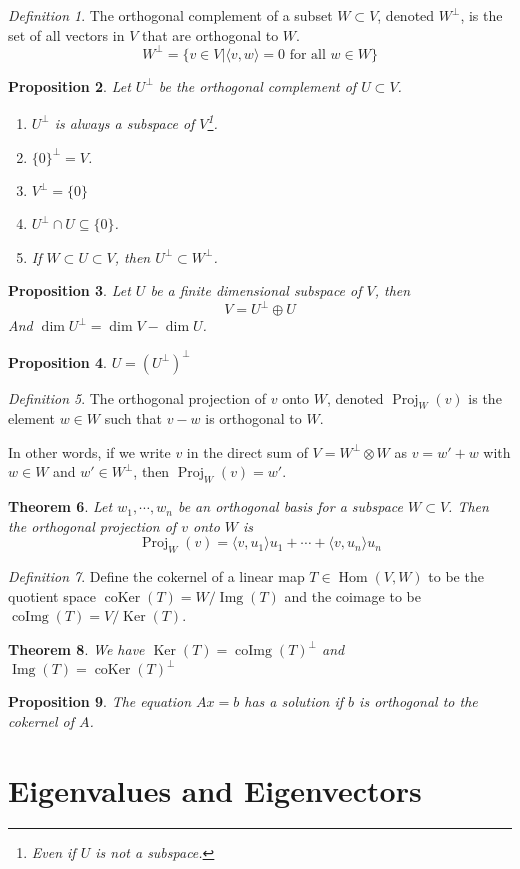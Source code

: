 \documentclass[12pt]{amsart}
\DeclareMathOperator{\coker}{coKer}
\DeclareMathOperator{\coimg}{coImg}
\renewcommand{\ker}{\Ker}
\DeclareMathOperator{\Ker}{Ker}
\DeclareMathOperator{\proj}{Proj}
\DeclareMathOperator{\Hom}{Hom}
\DeclareMathOperator{\img}{Img}
\newtheorem{theorem}{Theorem}[section]
\newtheorem{proposition}[theorem]{Proposition}
\theoremstyle{remark}
\newtheorem{definition}[theorem]{Definition}
\numberwithin{equation}{section}
\begin{document}
	\begin{definition}
		The orthogonal complement of a subset $W\subset V$, denoted $W^\perp$, is the set of all vectors in $V$ that are orthogonal to $W$.
		\[W^{\perp}=\{v\in V |\langle v,w\rangle =0 \text{ for all }w\in W\}\]
	\end{definition}
	
	\begin{proposition}Let $U^\perp$ be the orthogonal complement of $U\subset V$.
	\begin{enumerate}
		\item $U^\perp$ is always a subspace of $V$\footnote{Even if $U$ is not a subspace.}.
		\item $\{0\}^\perp=V$.
		\item $V^\perp=\{0\}$
		\item $U^\perp\cap U\subseteq \{0\}$.
		\item If $W\subset U\subset V$, then $U^\perp\subset W^\perp$.
	\end{enumerate} 
	\end{proposition}
	\begin{proposition}
		Let $U$ be a finite dimensional subspace of $V$, then
		\[V=U^\perp\oplus U\]
		And $\dim U^\perp=\dim V-\dim U$.
	\end{proposition}
	\begin{proposition}
		 $U=(U^\perp)^\perp$
	\end{proposition}
	
	\begin{definition}
			The orthogonal projection of $v$ onto $W$, denoted $\proj_W(v)$ is the element $w\in W$ such that $v-w$ is orthogonal to $W$.
			
			In other words, if we write $v$ in the direct sum of $V=W^\perp \otimes W$ as $v=w'+w$ with $w\in W$ and $w'\in W^\perp$, then $\proj_W(v)=w'$.

		\end{definition}

	\begin{theorem}
		Let $w_1,\cdots,w_n$ be an orthogonal basis for a subspace $W\subset V$. Then the orthogonal projection of $v$ onto $W$ is
		\[\proj_{W}(v)=\langle v,u_1\rangle u_1+\cdots+\langle v,u_n\rangle u_n\]
		
	\end{theorem}
	
	\begin{definition}
		Define the cokernel of a linear map $T\in\Hom(V,W)$ to be the quotient space $\coker(T)=W/\img(T)$ and the coimage to be $\coimg(T)=V/\ker(T)$.
	\end{definition}
	
	\begin{theorem}
		We have $\ker(T)=\coimg(T)^\perp$ and $\img(T)=\coker(T)^\perp$
	\end{theorem}
	
	\begin{proposition}
		The equation $Ax=b$ has a solution if $b$ is orthogonal to the cokernel of $A$.\end{proposition}
	\section{Eigenvalues and Eigenvectors}
	
\end{document}
